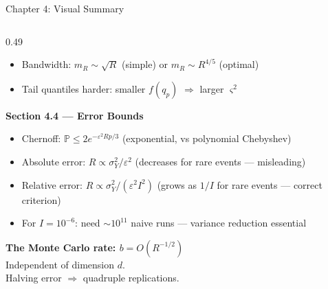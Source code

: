 \documentclass[aspectratio=169,10pt]{beamer}
\begin{document}
\begin{frame}{Chapter 4: Visual Summary}
\begin{columns}[T]
\begin{column}{0.49\textwidth}
\begin{itemize}
        \item Bandwidth: $m_R \sim \sqrt{R}$ (simple) or $m_R \sim R^{4/5}$ (optimal)
        \item Tail quantiles harder: smaller $f(q_p)$ $\Rightarrow$ larger $\varsigma^2$
      \end{itemize}
      \medskip
      \textbf{Section 4.4 --- Error Bounds}
      \begin{itemize}\small
        \item Chernoff: $\mathbb{P} \leq 2e^{-\varepsilon^2 Rp/3}$
          (exponential, vs polynomial Chebyshev)
        \item Absolute error: $R \propto \sigma_Y^2/\varepsilon^2$
          (decreases for rare events --- misleading)
        \item Relative error: $R \propto \sigma_Y^2/(\varepsilon^2 I^2)$
          (grows as $1/I$ for rare events --- correct criterion)
        \item For $I = 10^{-6}$: need $\sim 10^{11}$ naive runs ---
          variance reduction essential
      \end{itemize}
      \medskip
      \begin{center}
        \begin{alertblock}{}
          \centering
          \textbf{The Monte Carlo rate: $b = O(R^{-1/2})$}\\[2pt]
          \small Independent of dimension $d$.\\
          Halving error $\Rightarrow$ quadruple replications.
        \end{alertblock}
      \end{center}
    \end{column}
  \end{columns}
\end{frame}
\end{document}
